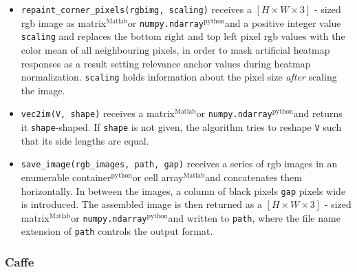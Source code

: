 \documentclass[a4wide]{article}
\newcommand{\mat}{$^\text{Matlab}$}
\newcommand{\py}{$^\text{python}$}
\begin{document}
\begin{itemize}
\begin{itemize}
		\item \texttt{repaint\_corner\_pixels(rgbimg, scaling)} receives a $[H \times W \times 3]$ - sized rgb image as matrix\mat or \texttt{numpy.ndarray}\py and a positive integer value \texttt{scaling} and replaces the bottom right and top left pixel rgb values with the color mean of all neighbouring pixels, in order to mask artificial heatmap responses as a result setting relevance anchor values during heatmap normalization. \texttt{scaling} holds information about the pixel size \emph{after} scaling the image. 
		\item \texttt{vec2im(V, shape)} receives a matrix\mat or \texttt{numpy.ndarray}\py and returns it \texttt{shape}-shaped. If \texttt{shape} is not given, the algorithm tries to reshape \texttt{V} such that its side lengths are equal.
		\item \texttt{save\_image(rgb\_images, path, gap)} receives a series of rgb images in an enumerable container\py or cell array\mat and concatenates them horizontally. In between the images, a column of black pixels \texttt{gap} pixels wide is introduced. The assembled image is then returned as a  $[H \times W \times 3]$ - sized matrix\mat or \texttt{numpy.ndarray}\py and written to \texttt{path}, where the file name extension of \texttt{path} controls the output format.
	\end{itemize}
\end{itemize}



\subsubsection*{Caffe}
\end{document}
